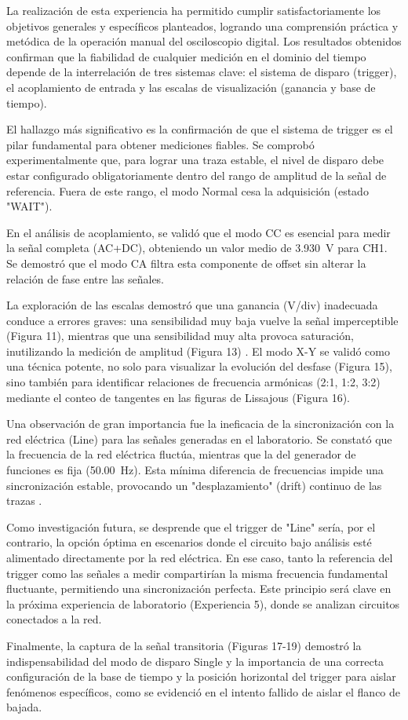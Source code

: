 La realización de esta experiencia ha permitido cumplir satisfactoriamente los objetivos generales y específicos planteados, logrando una comprensión práctica y metódica de la operación manual del osciloscopio digital. Los resultados obtenidos confirman que la fiabilidad de cualquier medición en el dominio del tiempo depende de la interrelación de tres sistemas clave: el sistema de disparo (trigger), el acoplamiento de entrada y las escalas de visualización (ganancia y base de tiempo).

El hallazgo más significativo es la confirmación de que el sistema de trigger es el pilar fundamental para obtener mediciones fiables. Se comprobó experimentalmente que, para lograr una traza estable, el nivel de disparo debe estar configurado obligatoriamente dentro del rango de amplitud de la señal de referencia. Fuera de este rango, el modo Normal cesa la adquisición (estado "WAIT").

En el análisis de acoplamiento, se validó que el modo CC es esencial para medir la señal completa (AC+DC), obteniendo un valor medio de \SI{3.930}{\volt} para CH1. Se demostró que el modo CA filtra esta componente de offset sin alterar la relación de fase entre las señales.

La exploración de las escalas demostró que una ganancia (V/div) inadecuada conduce a errores graves: una sensibilidad muy baja vuelve la señal imperceptible (Figura 11), mientras que una sensibilidad muy alta provoca saturación, inutilizando la medición de amplitud (Figura 13) . El modo X-Y se validó como una técnica potente, no solo para visualizar la evolución del desfase (Figura 15), sino también para identificar relaciones de frecuencia armónicas (2:1, 1:2, 3:2) mediante el conteo de tangentes en las figuras de Lissajous (Figura 16).

Una observación de gran importancia fue la ineficacia de la sincronización con la red eléctrica (Line) para las señales generadas en el laboratorio. Se constató que la frecuencia de la red eléctrica fluctúa, mientras que la del generador de funciones es fija (\SI{50.00}{\hertz}). Esta mínima diferencia de frecuencias impide una sincronización estable, provocando un "desplazamiento" (drift) continuo de las trazas .

Como investigación futura, se desprende que el trigger de "Line" sería, por el contrario, la opción óptima en escenarios donde el circuito bajo análisis esté alimentado directamente por la red eléctrica. En ese caso, tanto la referencia del trigger como las señales a medir compartirían la misma frecuencia fundamental fluctuante, permitiendo una sincronización perfecta. Este principio será clave en la próxima experiencia de laboratorio (Experiencia 5), donde se analizan circuitos conectados a la red.

Finalmente, la captura de la señal transitoria (Figuras 17-19) demostró la indispensabilidad del modo de disparo Single y la importancia de una correcta configuración de la base de tiempo y la posición horizontal del trigger para aislar fenómenos específicos, como se evidenció en el intento fallido de aislar el flanco de bajada.